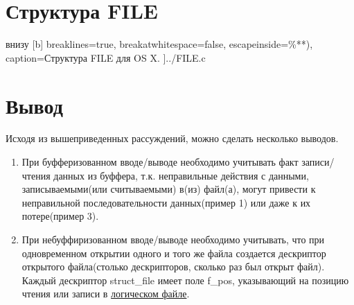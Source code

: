 \section{Структура FILE}

		 внизу [b] 
		breaklines=true,           %
		breakatwhitespace=false, %
		escapeinside={\%*}{*)},  %
		caption=Структура FILE для OS X.
		]{../FILE.c}

\section{Вывод}

Исходя из вышеприведенных рассуждений, можно сделать несколько выводов.

\begin{enumerate}
	\item  При буфферизованном вводе/выводе необходимо учитывать факт записи/чтения данных из буффера, т.к. неправильные действия с данными, записываемыми(или считываемыми) в(из) файл(а), могут привести к неправильной последовательности данных(пример 1) или даже к их потере(пример 3).
	\item При небуффиризованном вводе/выводе необходимо учитывать, что при одновременном открытии одного и того же файла создается дескриптор открытого файла(столько дескрипторов, сколько раз был открыт файл). Каждый дескриптор struct\_file имеет поле f\_pos, указывающий на позицию чтения или записи в \underline{логическом файле}.
 \end{enumerate}